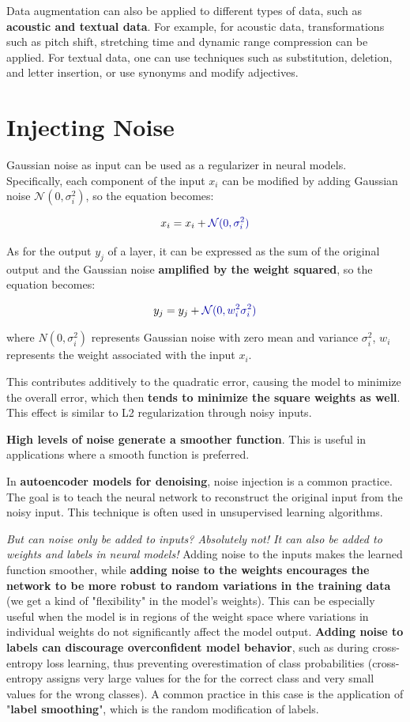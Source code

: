 Data augmentation can also be applied to different types of data, such as \textbf{acoustic and textual data}. For example, for acoustic data, transformations such as pitch shift, stretching time and dynamic range compression can be applied. For textual data, one can use techniques such as substitution, deletion, and letter insertion, or use synonyms and modify adjectives.

\section{Injecting Noise}

Gaussian noise as input can be used as a regularizer in neural models. Specifically, each component of the input \( x_i \) can be modified by adding Gaussian noise \( \mathcal{N}(0, \sigma_i^2) \), so the equation becomes:

$$ x_i = x_i + \textcolor{mybluee}{\mathcal{N}(0, \sigma_i^2)} $$

As for the output \( y_j \) of a layer, it can be expressed as the sum of the original output and the Gaussian noise \textbf{amplified by the weight squared}, so the equation becomes:

$$ y_j = y_j + \textcolor{mybluee}{\mathcal{N}(0, w_i^2 \sigma_i^2)} $$

where \( N(0, \sigma_i^2) \) represents Gaussian noise with zero mean and variance \( \sigma_i^2 \), \( w_i \) represents the weight associated with the input \( x_i \).

This contributes additively to the quadratic error, causing the model to minimize the overall error, which then \textbf{tends to minimize the square weights as well}. This effect is similar to L2 regularization through noisy inputs. 

\textbf{High levels of noise generate a smoother function}. This is useful in applications where a smooth function is preferred.

In \textbf{autoencoder models for denoising}, noise injection is a common practice. The goal is to teach the neural network to reconstruct the original input from the noisy input. This technique is often used in unsupervised learning algorithms.

\textit{But can noise only be added to inputs? Absolutely not! It can also be added to weights and labels in neural models!} Adding noise to the inputs makes the learned function smoother, while \textbf{adding noise to the weights encourages the network to be more robust to random variations in the training data} (we get a kind of "flexibility" in the model's weights). This can be especially useful when the model is in regions of the weight space where variations in individual weights do not significantly affect the model output. \textbf{Adding noise to labels can discourage overconfident model behavior}, such as during cross-entropy loss learning, thus preventing overestimation of class probabilities (cross-entropy assigns very large values for the for the correct class and very small values for the wrong classes). A common practice in this case is the application of "\textbf{label smoothing}", which is the random modification of labels.

